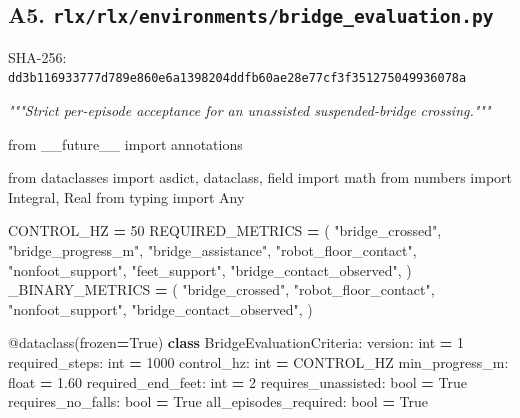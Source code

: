 \documentclass[
  american,
  11pt,
  letterpaper,
]{article}
\newenvironment{Shaded}{\begin{snugshade}}{\end{snugshade}}
\newcommand{\AttributeTok}[1]{\textcolor[rgb]{0.13,0.29,0.53}{#1}}
\newcommand{\BuiltInTok}[1]{#1}
\newcommand{\CommentTok}[1]{\textcolor[rgb]{0.56,0.35,0.01}{\textit{#1}}}
\newcommand{\DecValTok}[1]{\textcolor[rgb]{0.00,0.00,0.81}{#1}}
\newcommand{\FloatTok}[1]{\textcolor[rgb]{0.00,0.00,0.81}{#1}}
\newcommand{\ImportTok}[1]{#1}
\newcommand{\KeywordTok}[1]{\textcolor[rgb]{0.13,0.29,0.53}{\textbf{#1}}}
\newcommand{\NormalTok}[1]{#1}
\newcommand{\OperatorTok}[1]{\textcolor[rgb]{0.81,0.36,0.00}{\textbf{#1}}}
\newcommand{\StringTok}[1]{\textcolor[rgb]{0.31,0.60,0.02}{#1}}
\newcommand{\VariableTok}[1]{\textcolor[rgb]{0.00,0.00,0.00}{#1}}
\renewenvironment{Shaded}{\par\smallskip}{\par\smallskip}
\begin{document}
\subsection{\texorpdfstring{A5.
\texttt{rlx/\allowbreak{}rlx/\allowbreak{}environm\allowbreak{}ents/\allowbreak{}bridge\_\allowbreak{}evaluati\allowbreak{}on.py}}{A5. }}\label{a5.-rlxrlxenvironmentsbridge_evaluation.py}

SHA-256:
\texttt{dd3b1169\allowbreak{}33777d78\allowbreak{}9e860e6a\allowbreak{}1398204d\allowbreak{}dfb60ae2\allowbreak{}8e77cf3f\allowbreak{}35127504\allowbreak{}9936078a\allowbreak{}}

\begin{Shaded}
\begin{Highlighting}[]
\CommentTok{"""Strict per{-}episode acceptance for an unassisted suspended{-}bridge crossing."""}

\ImportTok{from}\NormalTok{ \_\_future\_\_ }\ImportTok{import}\NormalTok{ annotations}

\ImportTok{from}\NormalTok{ dataclasses }\ImportTok{import}\NormalTok{ asdict, dataclass, field}
\ImportTok{import}\NormalTok{ math}
\ImportTok{from}\NormalTok{ numbers }\ImportTok{import}\NormalTok{ Integral, Real}
\ImportTok{from}\NormalTok{ typing }\ImportTok{import}\NormalTok{ Any}


\NormalTok{CONTROL\_HZ }\OperatorTok{=} \DecValTok{50}
\NormalTok{REQUIRED\_METRICS }\OperatorTok{=}\NormalTok{ (}
    \StringTok{"bridge\_crossed"}\NormalTok{,}
    \StringTok{"bridge\_progress\_m"}\NormalTok{,}
    \StringTok{"bridge\_assistance"}\NormalTok{,}
    \StringTok{"robot\_floor\_contact"}\NormalTok{,}
    \StringTok{"nonfoot\_support"}\NormalTok{,}
    \StringTok{"feet\_support"}\NormalTok{,}
    \StringTok{"bridge\_contact\_observed"}\NormalTok{,}
\NormalTok{)}
\NormalTok{\_BINARY\_METRICS }\OperatorTok{=}\NormalTok{ (}
    \StringTok{"bridge\_crossed"}\NormalTok{,}
    \StringTok{"robot\_floor\_contact"}\NormalTok{,}
    \StringTok{"nonfoot\_support"}\NormalTok{,}
    \StringTok{"bridge\_contact\_observed"}\NormalTok{,}
\NormalTok{)}


\AttributeTok{@dataclass}\NormalTok{(frozen}\OperatorTok{=}\VariableTok{True}\NormalTok{)}
\KeywordTok{class}\NormalTok{ BridgeEvaluationCriteria:}
\NormalTok{    version: }\BuiltInTok{int} \OperatorTok{=} \DecValTok{1}
\NormalTok{    required\_steps: }\BuiltInTok{int} \OperatorTok{=} \DecValTok{1000}
\NormalTok{    control\_hz: }\BuiltInTok{int} \OperatorTok{=}\NormalTok{ CONTROL\_HZ}
\NormalTok{    min\_progress\_m: }\BuiltInTok{float} \OperatorTok{=} \FloatTok{1.60}
\NormalTok{    required\_end\_feet: }\BuiltInTok{int} \OperatorTok{=} \DecValTok{2}
\NormalTok{    requires\_unassisted: }\BuiltInTok{bool} \OperatorTok{=} \VariableTok{True}
\NormalTok{    requires\_no\_falls: }\BuiltInTok{bool} \OperatorTok{=} \VariableTok{True}
\NormalTok{    all\_episodes\_required: }\BuiltInTok{bool} \OperatorTok{=} \VariableTok{True}


\end{Highlighting}
\end{Shaded}
\end{document}
